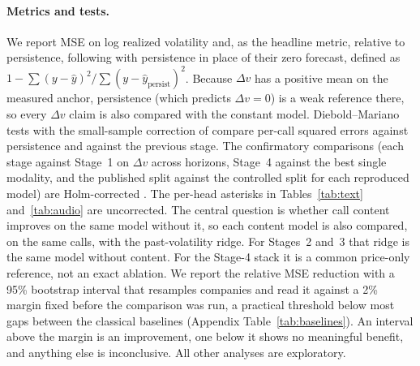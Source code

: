 \paragraph{Metrics and tests.}
We report MSE on log realized volatility and, as the headline metric, \Rtwo{} relative to persistence, following \citet{gukellyxiu2020} with persistence in place of their zero forecast, defined as
$1-\sum(y-\hat y)^2/\sum(y-\hat y_{\mathrm{persist}})^2$. Because $\Delta v$ has a positive mean on the measured anchor, persistence (which predicts $\Delta v{=}0$) is a weak reference there, so every $\Delta v$ claim is also compared with the constant model. Diebold--Mariano tests \citep{dm1995} with the small-sample correction of \citet{hln1997} compare per-call squared errors against persistence and against the
previous stage. The confirmatory comparisons (each stage against Stage~1 on $\Delta v$ across horizons, Stage~4 against the best single modality, and the
published split against the controlled split for each reproduced model) are
Holm-corrected \citep{holm1979}. The per-head asterisks in Tables~\ref{tab:text}
and~\ref{tab:audio} are uncorrected. The central question is whether call content improves on the same
model without it, so each content model is also compared, on the same calls,
with the past-volatility ridge. For Stages~2 and~3 that ridge is the same model
without content. For the Stage-4 stack it is a common price-only reference, not
an exact ablation. We report the relative MSE reduction
with a 95\% bootstrap interval that resamples companies and read it against a 2\%
margin fixed before the comparison was run, a practical threshold below most
gaps between the classical baselines (Appendix Table~\ref{tab:baselines}). An
interval above the margin is an
improvement, one below it shows no meaningful benefit, and anything else is
inconclusive. All other analyses are exploratory.


